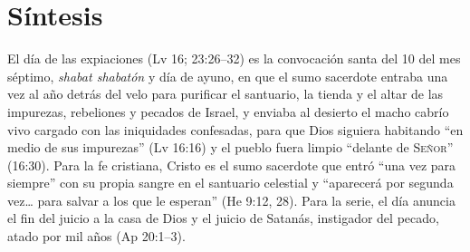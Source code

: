 \documentclass[11pt,letterpaper]{article}
\newcommand{\SENOR}{\textsc{Señor}}
\begin{document}
\section{Síntesis}

\begin{tcolorbox}[enhanced,unbreakable,colback=papiro,colframe=tierraroja,boxrule=1pt,arc=3pt,fonttitle=\bfseries,coltitle=papiro,colbacktitle=tierraroja,title={Yom haKipurim}]
El día de las expiaciones (Lv 16; 23:26--32) es la convocación santa del 10 del mes séptimo, \emph{shabat shabatón} y día de ayuno, en que el sumo sacerdote entraba una vez al año detrás del velo para purificar el santuario, la tienda y el altar de las impurezas, rebeliones y pecados de Israel, y enviaba al desierto el macho cabrío vivo cargado con las iniquidades confesadas, para que Dios siguiera habitando ``en medio de sus impurezas'' (Lv 16:16) y el pueblo fuera limpio ``delante de \SENOR'' (16:30). Para la fe cristiana, Cristo es el sumo sacerdote que entró ``una vez para siempre'' con su propia sangre en el santuario celestial y ``aparecerá por segunda vez\ldots{} para salvar a los que le esperan'' (He 9:12, 28). Para la serie, el día anuncia el fin del juicio a la casa de Dios y el juicio de Satanás, instigador del pecado, atado por mil años (Ap 20:1--3).
\end{tcolorbox}
\end{document}

